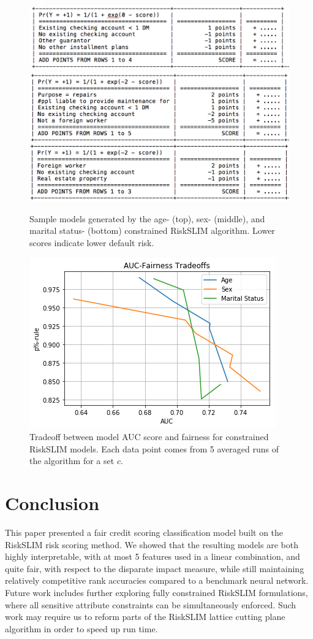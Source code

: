 \documentclass[11pt, margin=1in]{article}
\begin{document}
\begin{figure} \label{fig:samples}
	\centering
	\includegraphics[width=0.7\linewidth]{img/sample1}
	\includegraphics[width=0.7\linewidth]{img/sample2}
	\includegraphics[width=0.7\linewidth]{img/sample3}
	\caption{Sample models generated by the age- (top), sex- (middle), and marital status- (bottom) constrained RiskSLIM algorithm. Lower scores indicate lower default risk.}
\end{figure}

\begin{figure} \label{fig:tradeoffs}
	\centering
	\includegraphics[width=0.7\linewidth]{img/tradeoffs}
	\caption{Tradeoff between model AUC score and fairness for constrained RiskSLIM models. Each data point comes from 5 averaged runs of the algorithm for a set $c$.}
\end{figure}

\section{Conclusion}
This paper presented a fair credit scoring classification model built on the RiskSLIM risk scoring method. We showed that the resulting models are both highly interpretable, with at most 5 features used in a linear combination, and quite fair, with respect to the disparate impact measure, while still maintaining relatively competitive rank accuracies compared to a benchmark neural network. Future work includes further exploring fully constrained RiskSLIM formulations, where all sensitive attribute constraints can be simultaneously enforced.  Such work may require us to reform parts of the RiskSLIM lattice cutting plane algorithm in order to speed up run time.   



\end{document}
